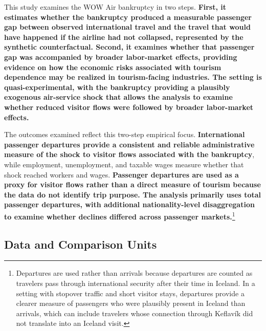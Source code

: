 \documentclass[12pt]{article}
\begin{document}
This study examines the WOW Air bankruptcy in two steps. \textbf{First, it estimates whether the bankruptcy produced a measurable passenger gap between observed international travel and the travel that would have happened if the airline had not collapsed, represented by the synthetic counterfactual. Second, it examines whether that passenger gap was accompanied by broader labor-market effects, providing evidence on how the economic risks associated with tourism dependence may be realized in tourism-facing industries. The setting is quasi-experimental, with the bankruptcy providing a plausibly exogenous air-service shock that allows the analysis to examine whether reduced visitor flows were followed by broader labor-market effects.}

The outcomes examined reflect this two-step empirical focus. \textbf{International passenger departures provide a consistent and reliable administrative measure of the shock to visitor flows associated with the bankruptcy}, while employment, unemployment, and taxable wages measure whether that shock reached workers and wages. \textbf{Passenger departures are used as a proxy for visitor flows rather than a direct measure of tourism because the data do not identify trip purpose. The analysis primarily uses total passenger departures, with additional nationality-level disaggregation to examine whether declines differed across passenger markets.}\footnote{Departures are used rather than arrivals because departures are counted as travelers pass through international security after their time in Iceland. In a setting with stopover traffic and short visitor stays, departures provide a clearer measure of passengers who were plausibly present in Iceland than arrivals, which can include travelers whose connection through Keflavík did not translate into an Iceland visit.} 


\subsection{Data and Comparison Units}\label{sec:data_comparison_units}
\end{document}

